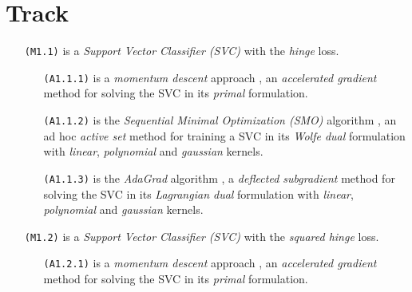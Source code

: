 \section{Track}

\begin{itemize}
\item[\texttt{(M1.1)}] is a \emph{Support Vector Classifier (SVC)} with the \emph{hinge} loss.

\begin{itemize}
\item[\texttt{(A1.1.1)}] is a \emph{momentum descent} approach \cite{polyak1964some, nesterov1998introductory}, an \emph{accelerated gradient} method for solving the SVC in its \emph{primal} formulation.

\item[\texttt{(A1.1.2)}] is the \emph{Sequential Minimal Optimization (SMO)} algorithm \cite{platt1998sequential, keerthi2001improvements}, an ad hoc \emph{active set} method for training a SVC in its \emph{Wolfe dual} formulation with \emph{linear}, \emph{polynomial} and \emph{gaussian} kernels.

\item[\texttt{(A1.1.3)}] is the \emph{AdaGrad} algorithm \cite{duchi2011adaptive}, a \emph{deflected subgradient} method for solving the SVC in its \emph{Lagrangian dual} formulation with \emph{linear}, \emph{polynomial} and \emph{gaussian} kernels.
\end{itemize}

\end{itemize}

\begin{itemize}
\item[\texttt{(M1.2)}] is a \emph{Support Vector Classifier (SVC)} with the \emph{squared hinge} loss.

\begin{itemize}
\item[\texttt{(A1.2.1)}] is a \emph{momentum descent} approach \cite{polyak1964some, nesterov1998introductory}, an \emph{accelerated gradient} method for solving the SVC in its \emph{primal} formulation.
\end{itemize}

\end{itemize}

\bigskip

